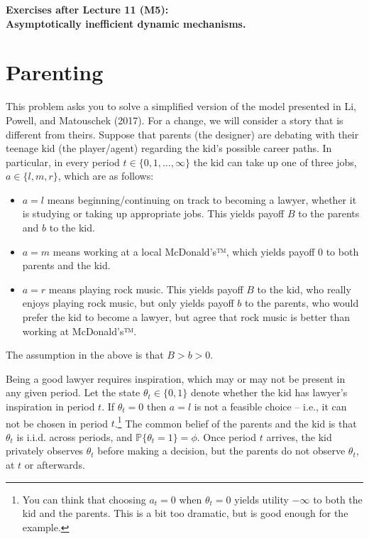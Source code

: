 \documentclass[a4paper]{article}
\begin{document}
\begin{center}
		\LARGE\textbf{Exercises after Lecture 11 (M5):\\ Asymptotically inefficient dynamic mechanisms.}
\end{center}



\section{Parenting}
	
	This problem asks you to solve a simplified version of the model presented in Li, Powell, and Matouschek (2017). 
	For a change, we will consider a story that is different from theirs. Suppose that parents (the designer) are debating with their teenage kid (the player/agent) regarding the kid's possible career paths. In particular, in every period $t \in \{0,1,\dots,\infty\}$ the kid can take up one of three jobs, $a \in \{l,m,r\}$, which are as follows:
	\begin{itemize}
		\item $a=l$ means beginning/continuing on track to becoming a lawyer, whether it is studying or taking up appropriate jobs. This yields payoff $B$ to the parents and $b$ to the kid.
		
		\item $a=m$ means working at a local McDonald's™, which yields payoff $0$ to both parents and the kid. 
		
		\item $a=r$ means playing rock music. This yields payoff $B$ to the kid, who really enjoys playing rock music, but only yields payoff $b$ to the parents, who would prefer the kid to become a lawyer, but agree that rock music is better than working at McDonald's™.
	\end{itemize}
	The assumption in the above is that $B>b>0$.
	
	Being a good lawyer requires inspiration, which may or may not be present in any given period. Let the state $\theta_t \in \{0,1\}$ denote whether the kid has lawyer's inspiration in period $t$. If $\theta_t=0$ then $a=l$ is not a feasible choice -- i.e., it can not be chosen in period $t$.\footnote{You can think that choosing $a_t=0$ when $\theta_t=0$ yields utility $-\infty$ to both the kid and the parents. This is a bit too dramatic, but is good enough for the example.} The common belief of the parents and the kid is that $\theta_t$ is i.i.d. across periods, and $\mathbb{P}\{\theta_t=1\} = \phi$. Once period $t$ arrives, the kid privately observes $\theta_t$ before making a decision, but the parents do not observe $\theta_t$, at $t$ or afterwards.
	
\end{document}
